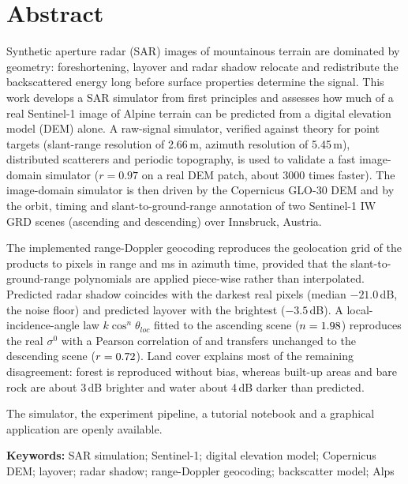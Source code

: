 \chapter*{Abstract}
\thispagestyle{plain}

Synthetic aperture radar (SAR) images of mountainous terrain are dominated by geometry: foreshortening, layover and
radar shadow relocate and redistribute the backscattered energy long before surface properties determine the signal.
This work develops a SAR simulator from first principles and assesses how much of a real Sentinel-1 image of Alpine
terrain can be predicted from a digital elevation model (DEM) alone. A raw-signal simulator, verified against theory
for point targets (slant-range resolution of 2.66\,m, azimuth resolution of 5.45\,m), distributed scatterers and
periodic topography, is used to validate a fast image-domain simulator ($r=0.97$ on a real DEM patch, about 3000 times
faster). The image-domain simulator is then driven by the Copernicus GLO-30 DEM and by the orbit, timing and
slant-to-ground-range annotation of two Sentinel-1 IW GRD scenes (ascending and descending) over Innsbruck, Austria.

The implemented range-Doppler geocoding reproduces the geolocation grid of the products to \geoDpixMax{} pixels in
range and \geoDtMax{} ms in azimuth time, provided that the slant-to-ground-range polynomials are applied piece-wise
rather than interpolated. Predicted radar shadow coincides with the darkest real pixels (median $-21.0$\,dB, the noise
floor) and predicted layover with the brightest ($-3.5$\,dB). A local-incidence-angle law $k\cos^{n}\theta_{loc}$
fitted to the ascending scene ($n=1.98$) reproduces the real $\sigma^0$ with a Pearson correlation of \rAsc{} and
transfers unchanged to the descending scene ($r=0.72$). Land cover explains most of the remaining disagreement:
forest is reproduced without bias, whereas built-up areas and bare rock are about 3\,dB brighter and water about 4\,dB
darker than predicted.

The simulator, the experiment pipeline, a tutorial notebook and a graphical application are openly available.

\vspace{1cm}
\noindent\textbf{Keywords:} SAR simulation; Sentinel-1; digital elevation model; Copernicus DEM; layover; radar
shadow; range-Doppler geocoding; backscatter model; Alps
\cleardoublepage

